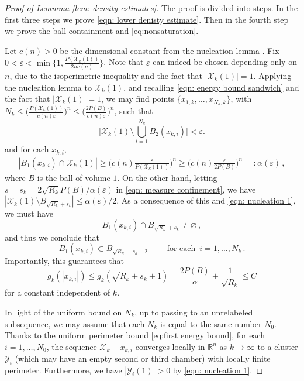 \documentclass[10pt,reqno]{amsart}
\numberwithin{equation}{section}
\theoremstyle{definition}
\newcommand{\eps}{\epsilon}
\renewcommand{\eps}{\varepsilon}
\newcommand{\e}{\varepsilon}
\newcommand{\X}{\mathcal{X}}
\begin{document}
{\begin{proof}[Proof of Lemmma \ref{lem: density estimates}]
The proof is divided into steps. In the first three steps we prove \eqref{eqn: lower denisty estimate}. 
Then in the fourth step we prove the ball containment and \eqref{eq:nonsaturation}.

\medskip

Let $c(n)>0$ be the dimensional constant from the nucleation lemma \cite[Lemma 29.10]{Mag12}. Fix $0<\eps<\min \{1, \tfrac{P(\X_k(1))}{2nc(n)}\}$. Note that $\eps$ can indeed be chosen depending only on $n$, due to the isoperimetric inequality and the fact that $|\X_k(1)|=1$.
 Applying the nucleation lemma to $\X_k(1)$, and recalling \eqref{eqn: energy bound sandwich} and the fact that $|\X_k(1)|=1$, 
we may find points
$\{x_{1,k},\dots , x_{N_k,k}\}$, with $N_k\leq \big(\tfrac{P(\X_k(1))}{c(n)\eps}\big)^n \leq \big(\tfrac{2P(B)}{c(n)\eps}\big)^n$, such that
{
\begin{equation}
    \label{eqn: cover almost all}
  \Big|\X_k(1)\setminus \bigcup_{i=1}^{N_k} B_2(x_{k,i})\Big| < {\eps}. 
\end{equation}
and} for each $x_{k,i}$,
\begin{align}
    \label{eqn: nucleation 1}
  |B_1(x_{k,i}) \cap \X_k(1)| \geq \bigg(c(n) \frac{\e}{P(\X_k(1))} \bigg)^n \geq \bigg(c(n) \frac{\e}{2P(B)} \bigg)^n =:\alpha{(\e)}\,,
  \end{align}
where $B$ is the ball of volume $1$. On the other hand, letting $s = s_k = 2\sqrt{R_{k}}P(B)/\alpha{(\e)}$ in \eqref{eqn: measure confinement}, we have $|\X_k(1)\setminus B_{{\sqrt{R_k}}+s_k}| \leq \alpha{(\e)}/2$. As a consequence of this and \eqref{eqn: nucleation 1}, we must have
\[
    B_1(x_{k,i})\cap B_{{\sqrt{R_k}}+s_k} \neq \varnothing\,,
\]
and thus we conclude that
\[
B_{1}(x_{k,i}) \subset B_{{\sqrt{R_k}} + s_k+2} \qquad \text{ for each } \, i =1,\dots , N_k\,.
\]
Importantly, this guarantees that 
\begin{equation}
    \label{eqn: g bound}
g_k(|x_{k,i}|) \leq g_k({\sqrt{R_k}} + s_k + 1)=\frac{2P(B)}{\alpha}+\frac{1}{\sqrt{R_k}}\leq C
\end{equation}
for a constant independent of $k$.

In light of the uniform bound on $N_k$, up to passing to an unrelabeled subsequence, we may assume that each $N_k$ is equal to the same number $N_0$. Thanks to the uniform perimeter bound \eqref{eq:first energy bound}, for each $i=1,\dots, N_0$, the sequence $\X_k- x_{k,i}$ converges locally in $\mathbb{R}^n$ as $k\to \infty$ to a cluster $\mathcal{Y}_i$ (which may have an empty second or third chamber)
with locally finite perimeter. Furthermore, we have $|\mathcal{Y}_i(1)|>0$ by \eqref{eqn: nucleation 1}.


\end{proof}}
\end{document}
